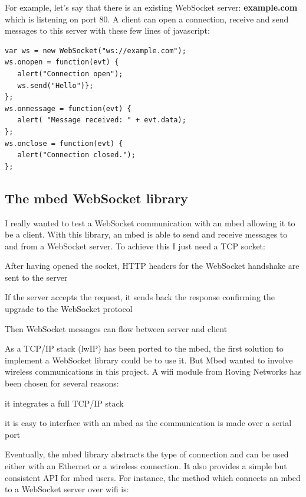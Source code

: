 \documentclass[pdftex,10pt,a4paper]{report}
\newenvironment{packed_item}{
\begin{itemize}
  \setlength{\itemsep}{1pt}
  \setlength{\parskip}{0pt}
  \setlength{\parsep}{0pt}
}{\end{itemize}}
\begin{document}
For example, let's say that there is an existing WebSocket server: \textbf{example.com} which is listening on port 80. A client can open a connection, receive and send messages to this server with these few lines of javascript:

\begin{center}
\begin{lstlisting}[label=Javascript Websocket Hello World,caption=Javascript Websocket Hello World]
var ws = new WebSocket("ws://example.com");
ws.onopen = function(evt) { 
   alert("Connection open"); 
   ws.send("Hello")}; 
};
ws.onmessage = function(evt) { 
   alert( "Message received: " + evt.data); 
}; 
ws.onclose = function(evt) { 
   alert("Connection closed."); 
};
\end{lstlisting}
\end{center}


\subsection{The mbed WebSocket library}
I really wanted to test a WebSocket communication with an mbed allowing it to be a client. With this library, an mbed is able to send and receive messages to and from a WebSocket server. To achieve this I just need a TCP socket:
\begin{packed_item}
	\item After having opened the socket, HTTP headers for the WebSocket handshake are sent to the server
	\item If the server accepts the request, it sends back the response confirming the upgrade to the WebSocket protocol 
	\item Then WebSocket messages can flow between server and client
\end{packed_item}

As a TCP/IP stack (lwIP) has been ported to the mbed, the first solution to implement a WebSocket library could be to use it. But Mbed wanted to involve wireless communications in this project. A wifi module from Roving Networks has been chosen for several reasons:
\begin{packed_item}
	\item it integrates a full TCP/IP stack
	\item it is easy to interface with an mbed as the communication is made over a serial port
\end{packed_item}

Eventually, the mbed library abstracts the type of connection and can be used either with an Ethernet or a wireless connection. It also provides a simple but consistent API for mbed users. For instance, the method which connects an mbed to a WebSocket server over wifi is:
\end{document}
